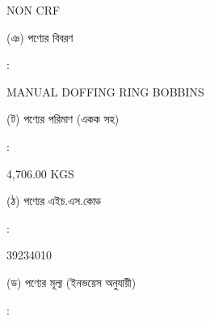 \documentclass[12pt]{article}
\newcommand{\good}{MANUAL DOFFING RING BOBBINS}
\newcommand{\pkg}{4,706.00 KGS}
\newcommand{\crf}{NON CRF}
\newcommand{\crfdt}{}
\newcommand{\hscode}{39234010}
\begin{document}
\begin{minipage}[t]{0.53\linewidth}
{\crf} \hspace{2em} {\crfdt}
\\
\end{minipage}
\begin{minipage}[t]{0.05\linewidth}
\hspace*{1em}
\end{minipage}
\begin{minipage}[t]{0.40\linewidth}
(ঞ) পণ্যের বিবরণ
\end{minipage}
\begin{minipage}[t]{0.02\linewidth}
:
\end{minipage}
\begin{minipage}[t]{0.53\linewidth}
{\good}
\\
\end{minipage}
\begin{minipage}[t]{0.05\linewidth}
\hspace*{1em}
\end{minipage}
\begin{minipage}[t]{0.40\linewidth}
(ট) পণ্যের পরিমাণ (একক সহ)
\end{minipage}
\begin{minipage}[t]{0.02\linewidth}
:
\end{minipage}
\begin{minipage}[t]{0.53\linewidth}
{\pkg}
\\
\end{minipage}
\begin{minipage}[t]{0.05\linewidth}
\hspace*{1em}
\end{minipage}
\begin{minipage}[t]{0.40\linewidth}
(ঠ) পণ্যের এইচ.এস.কোড
\end{minipage}
\begin{minipage}[t]{0.02\linewidth}
:
\end{minipage}
\begin{minipage}[t]{0.53\linewidth}
{\hscode}
\\
\end{minipage}
\begin{minipage}[t]{0.05\linewidth}
\hspace*{1em}
\end{minipage}
\begin{minipage}[t]{0.40\linewidth}
(ড) পণ্যের মূল্য (ইনভয়েস অনুযায়ী)
\end{minipage}
\begin{minipage}[t]{0.02\linewidth}
:
\end{minipage}
\end{document}

